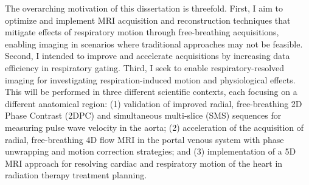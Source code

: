 The overarching motivation of this dissertation is threefold. First, I aim to optimize and implement MRI acquisition and reconstruction techniques that mitigate effects of respiratory motion through free-breathing acquisitions, enabling imaging in scenarios where traditional approaches may not be feasible. Second, I intended to improve and accelerate acquisitions by increasing data efficiency in respiratory gating. Third, I seek to enable respiratory-resolved imaging for investigating respiration-induced motion and physiological effects. This will be performed in three different scientific contexts, each focusing on a different anatomical region: (1) validation of improved radial, free-breathing 2D Phase Contrast (2DPC) and simultaneous multi-slice (SMS) sequences for measuring pulse wave velocity in the aorta; (2) acceleration of the acquisition of radial, free-breathing 4D flow MRI in the portal venous system with phase unwrapping and motion correction strategies; and (3) implementation of a 5D MRI approach for resolving cardiac and respiratory motion of the heart in radiation therapy treatment planning.

